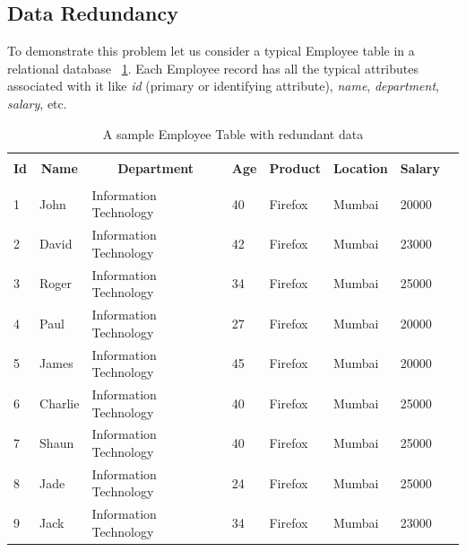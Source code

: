 \documentclass[12pt, oneside]{book}
\begin{document}
\subsection{Data Redundancy}
To demonstrate this problem let us consider a typical Employee table in a relational database ~\ref{tab:employee_demo}. Each Employee record has all the typical attributes associated with it like \emph{id} (primary or identifying attribute), \emph{name}, \emph{department}, \emph{salary}, etc. 
\begin{table}[h]
\begin{center}
    \begin{tabular}{| m{} | m{} | m{} | m{} | m{} | m{} | m{} | @{}m{0pt}@{}}
    \hline
    \multicolumn{1}{|c|}{} & \multicolumn{1}{c|}{} & \multicolumn{1}{c|}{} & \multicolumn{1}{c|}{} & \multicolumn{1}{c|}{} & \multicolumn{1}{c|}{} & \multicolumn{1}{c|}{} &  \\
    \multicolumn{1}{|c|}{\textbf{Id}} & \multicolumn{1}{c|}{\textbf{Name}} & \multicolumn{1}{c|}{\textbf{Department}} & \multicolumn{1}{c|}{\textbf{Age}} & \multicolumn{1}{c|}{\textbf{Product}} & \multicolumn{1}{c|}{\textbf{Location}} & \multicolumn{1}{c|}{\textbf{Salary}} & \\
    \multicolumn{1}{|c|}{} & \multicolumn{1}{c|}{} & \multicolumn{1}{c|}{} & \multicolumn{1}{c|}{} & \multicolumn{1}{c|}{} & \multicolumn{1}{c|}{} & \multicolumn{1}{c|}{} &  \\
    \hline
    1 & John & Information Technology & 40 & Firefox & Mumbai & 20000 & \\ [1ex] \hline
    2 & David & Information Technology & 42 & Firefox & Mumbai & 23000 & \\ [1ex] \hline
    3 & Roger & Information Technology & 34 & Firefox & Mumbai & 25000 & \\ [1ex] \hline
    4 & Paul & Information Technology & 27 & Firefox & Mumbai & 20000 & \\ [1ex] \hline
    5 & James & Information Technology & 45 & Firefox & Mumbai & 20000 & \\ [1ex] \hline
    6 & Charlie & Information Technology & 40 & Firefox & Mumbai & 25000 & \\ [1ex] \hline
    7 & Shaun & Information Technology & 40 & Firefox & Mumbai & 25000 & \\ [1ex] \hline
    8 & Jade & Information Technology & 24 & Firefox & Mumbai & 25000 & \\ [1ex] \hline
    9 & Jack & Information Technology & 34 & Firefox & Mumbai & 23000 & \\ [1ex] \hline
    \end{tabular}
\end{center}
    \caption{A sample Employee Table with redundant data}
    \label{tab:employee_demo}
\end{table}
\end{document}
